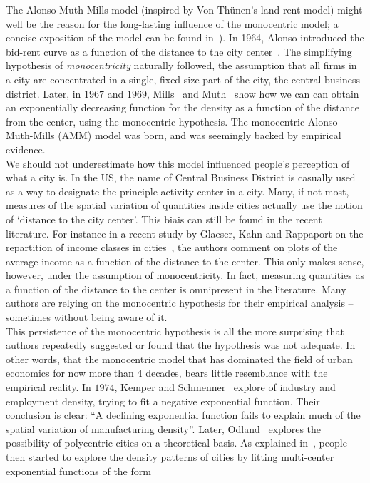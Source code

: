 The Alonso-Muth-Mills model (inspired by Von Th\"unen's land rent model)  might well be the reason for the long-lasting influence of
the monocentric model; a concise exposition of the model can be found
in~\cite{Brueckner:1987,Fujita:1989}). In 1964, Alonso introduced the bid-rent curve as a
function of the distance to the city center~\cite{Alonso:1964}. The simplifying hypothesis of
\emph{monocentricity} naturally followed, the assumption that all firms in a
city are concentrated in a single, fixed-size part of the city, the central business
district. Later, in $1967$ and $1969$, Mills~\cite{Mills:1967} and
Muth~\cite{Muth:1969} show how we can can obtain an exponentially decreasing
function for the density as a function of the distance from the center, using
the monocentric hypothesis. The monocentric Alonso-Muth-Mills (AMM) model was
born, and was seemingly backed by empirical evidence.\\


We should not underestimate how this model influenced people's perception
of what a city is. In the US, the name of Central Business District is casually
used as a way to designate the principle activity center in a city.  Many, if
not most, measures of the spatial variation of quantities inside cities actually
use the notion of `distance to the city center'. This biais can still be found
in the recent literature. For instance in a recent study by Glaeser, Kahn and
Rappaport on the repartition of income classes in cities~\cite{Glaeser:2008},
the authors comment on plots of the average income as a function of the distance
to the center. This only makes sense, however, under the assumption of monocentricity.
In fact, measuring quantities as a function of the distance to the center is
omnipresent in the literature. Many authors are relying on the monocentric
hypothesis for their empirical analysis -- sometimes without being aware of
it.\\

This persistence of the monocentric hypothesis is all the more surprising that
authors repeatedly suggested or found that the hypothesis was not adequate. In
other words, that the monocentric model that has dominated the field of urban
economics for now more than 4 decades, bears little resemblance with the
empirical reality. In
$1974$, Kemper and Schmenner~\cite{Kemper:1974} explore of industry and
employment density, trying to fit a negative exponential function. Their
conclusion is clear: ``A declining exponential function fails to explain much of
the spatial variation of manufacturing density''. Later,
Odland~\cite{Odland:1978} explores the possibility of polycentric cities on a
theoretical basis. As explained in~\cite{Griffith:1981}, people then started to
explore the density patterns of cities by fitting multi-center exponential
functions of the form

